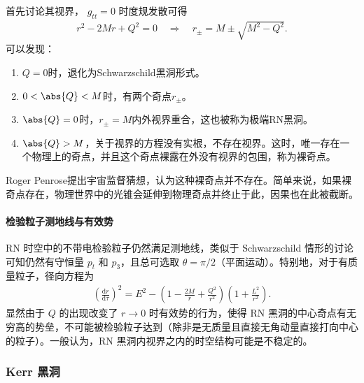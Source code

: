 首先讨论其视界， $g_{tt}=0$ 时度规发散可得
\begin{align}
r^{2}-2Mr+Q^{2}=0
\quad\Rightarrow\quad
r_{\pm}=M\pm\sqrt{M^{2}-Q^{2}} .
\end{align}
可以发现：
\begin{enumerate}[label=(\arabic*)]
    \item $Q = 0$时，退化为Schwarzschild黑洞形式。
    \item $0 < \abs{Q} < M$时，有两个奇点$r_\pm$。
    \item $\abs{Q} = 0$时，$r_{\pm} = M$内外视界重合，这也被称为极端RN黑洞。
    \item $\abs{Q}>M$，关于视界的方程没有实根，不存在视界。这时，唯一存在一个物理上的奇点，并且这个奇点裸露在外没有视界的包围，称为裸奇点。
\end{enumerate}
Roger Penrose提出宇宙监督猜想，认为这种裸奇点并不存在。简单来说，如果裸奇点存在，物理世界中的光锥会延伸到物理奇点并终止于此，因果也在此被截断。
\paragraph{检验粒子测地线与有效势}
RN 时空中的不带电检验粒子仍然满足测地线，类似于 Schwarzschild 情形的讨论可知仍然有守恒量 $p_{t}$ 和 $p_{3}$，且总可选取 $\theta=\pi/2$（平面运动）。特别地，对于有质量粒子，径向方程为
\begin{align}
\left(\frac{\mathrm{d}r}{\mathrm{d}\tau}\right)^{2}
=
E^{2}
-\left(1-\frac{2M}{r}+\frac{Q^{2}}{r^{2}}\right)\left(1+\frac{L^{2}}{r^{2}}\right).
\end{align}
显然由于 $Q$ 的出现改变了 $r\to 0$ 时有效势的行为，使得 RN 黑洞的中心奇点有无穷高的势垒，不可能被检验粒子达到（除非是无质量且直接无角动量直接打向中心的粒子）。一般认为，RN 黑洞内视界之内的时空结构可能是不稳定的。

\subsubsection{Kerr 黑洞}

